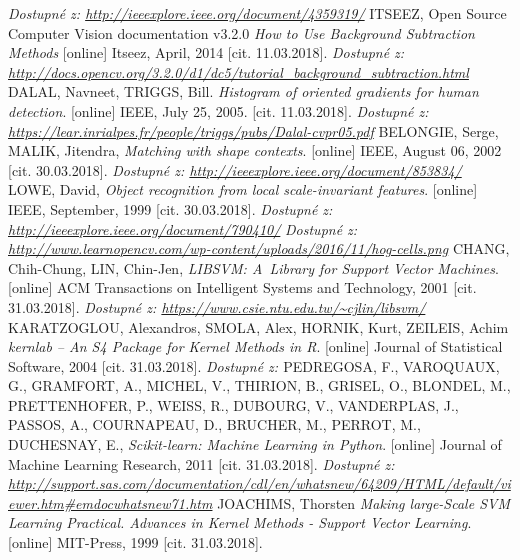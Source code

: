 \begin{thebibliography}{99}
 		\textit{Dostupné z: \url{http://ieeexplore.ieee.org/document/4359319/}}
	ITSEEZ, Open Source Computer Vision documentation v3.2.0 \textit{How to Use Background Subtraction Methods} [online] Itseez, April, 2014 [cit. 11.03.2018].
		\textit{Dostupné z: \url{http://docs.opencv.org/3.2.0/d1/dc5/tutorial_background_subtraction.html}}
	 {DALAL, Navneet, TRIGGS, Bill. \textit{Histogram of oriented gradients for human detection}. [online] IEEE, July 25, 2005. [cit. 11.03.2018].
		\textit{Dostupné z: \url{https://lear.inrialpes.fr/people/triggs/pubs/Dalal-cvpr05.pdf}}}
	 BELONGIE, Serge, MALIK, Jitendra, \textit{Matching with shape contexts}. [online] IEEE, August 06, 2002 [cit. 30.03.2018]. 
 		\textit{Dostupné z: \url{http://ieeexplore.ieee.org/document/853834/}}
 	 LOWE, David, \textit{Object recognition from local scale-invariant features}. [online] IEEE, September, 1999 [cit. 30.03.2018]. 
 		\textit{Dostupné z: \url{http://ieeexplore.ieee.org/document/790410/}}
	 \textit{Dostupné z: \url{http://www.learnopencv.com/wp-content/uploads/2016/11/hog-cells.png}}
	 CHANG, Chih-Chung, LIN, Chin-Jen, \textit{LIBSVM: A~Library for Support Vector Machines}. [online] ACM Transactions on Intelligent Systems and Technology, 2001 [cit. 31.03.2018]. 
 		\textit{Dostupné z: \url{https://www.csie.ntu.edu.tw/~cjlin/libsvm/}}
 	 KARATZOGLOU, Alexandros, SMOLA, Alex, HORNIK, Kurt, ZEILEIS, Achim \textit{kernlab -- An {S4} Package for Kernel Methods in {R}}. [online] Journal of Statistical Software, 2004 [cit. 31.03.2018]. 
 		\textit{Dostupné z: \url{}}
 	 PEDREGOSA, F., VAROQUAUX, G., GRAMFORT, A., MICHEL, V., THIRION, B., GRISEL, O., BLONDEL, M., PRETTENHOFER, P., WEISS, R., DUBOURG, V., VANDERPLAS, J., PASSOS, A., COURNAPEAU, D., BRUCHER, M., PERROT, M., DUCHESNAY, E., \textit{Scikit-learn: Machine Learning in Python}. [online] Journal of Machine Learning Research, 2011 [cit. 31.03.2018]. 
			\textit{Dostupné z: \url{http://support.sas.com/documentation/cdl/en/whatsnew/64209/HTML/default/viewer.htm\#emdocwhatsnew71.htm}}
 	 JOACHIMS, Thorsten \textit{Making large-Scale SVM Learning Practical. Advances in Kernel Methods - Support Vector Learning}. [online] MIT-Press, 1999 [cit. 31.03.2018]. 

\end{thebibliography}
